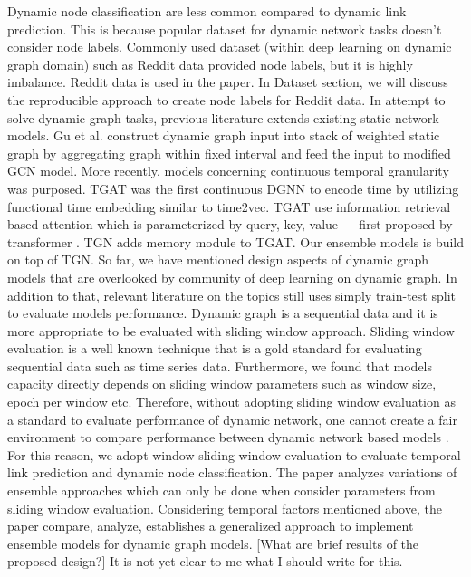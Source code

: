 \documentclass{IEEEtran}
\begin{document}
Dynamic node classification are less common compared to dynamic link prediction. This is because popular dataset for dynamic network tasks doesn't consider node labels. Commonly used dataset (within deep learning on dynamic graph domain) such as Reddit data provided node labels, but it is highly imbalance. Reddit data is used in the paper. In Dataset section, we will discuss the reproducible approach to create node labels for Reddit data.
In attempt to solve dynamic graph tasks, previous literature extends existing static network models. Gu et al. \cite{qu2020continuous} construct dynamic graph input into stack of weighted static graph by aggregating graph within fixed interval and feed the input to modified GCN model. More recently, models concerning continuous temporal granularity was purposed. TGAT was the first continuous DGNN to encode time by utilizing functional time embedding similar to time2vec. TGAT use information retrieval based attention which is parameterized by query, key, value --- first proposed by transformer \cite{vaswani2017attention}. TGN \cite{rossi2020temporal} adds memory module to TGAT. Our ensemble models is build on top of TGN.
So far, we have mentioned design aspects of dynamic graph models that are overlooked by community of deep learning on dynamic graph. In addition to that, relevant literature on the topics still uses simply train-test split to evaluate models performance. Dynamic graph is a sequential data and it is more appropriate to be evaluated with sliding window approach. Sliding window evaluation is a well known technique that is a gold standard for evaluating sequential data such as time series data. Furthermore, we found that models capacity directly depends on sliding window parameters such as window size, epoch per window etc. Therefore, without adopting sliding window evaluation as a standard to evaluate performance of dynamic network, one cannot create a fair environment to compare performance between dynamic network based models \cite{skarding2021benchmarking}. For this reason, we adopt window sliding window evaluation to evaluate temporal link prediction and dynamic node classification. The paper analyzes variations of ensemble approaches which can only be done when consider parameters from sliding window evaluation. Considering temporal factors mentioned above, the paper compare, analyze, establishes a generalized approach to implement ensemble models for dynamic graph models.
[What are brief results of the proposed design?] It is not yet clear to me what I should write for this.
\end{document}
